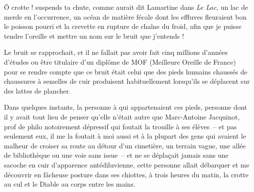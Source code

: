 Ô crotte ! suspends ta chute, comme aurait dit Lamartine dans \textit{Le Lac}, un lac de merde en l’occurrence, un océan de matière fécale dont les effluves fleuraient bon le poisson pourri et la crevette en rupture de chaîne du froid, afin que je puisse tendre l’oreille et mettre un nom sur le bruit que j’entends !

Le bruit se rapprochait, et il ne fallait pas avoir fait cinq millions d’années d’études ou être titulaire d’un diplôme de MOF (Meilleure Oreille de France) pour se rendre compte que ce bruit était celui que des pieds humains chaussés de chaussures à semelles de cuir produisent habituellement lorsqu’ils se déplacent sur des lattes de plancher.

Dans quelques instants, la personne à qui appartenaient ces pieds, personne dont il y avait tout lieu de penser qu’elle n’était autre que Marc-Antoine Jacquinot, prof de philo notoirement dépressif qui foutait la trouille à ses élèves~-- et pas seulement eux, il me la foutait à moi aussi et à la plupart des gens qui avaient le malheur de croiser sa route au détour d’un cimetière, un terrain vague, une allée de bibliothèque ou une voie sans issue~-- et ne se déplaçait jamais sans une sacoche en cuir d’apparence antédiluvienne, cette personne allait débarquer et me découvrir en fâcheuse posture dans ses chiottes, à trois heures du matin, la crotte au cul et le Diable au corps entre les mains.

